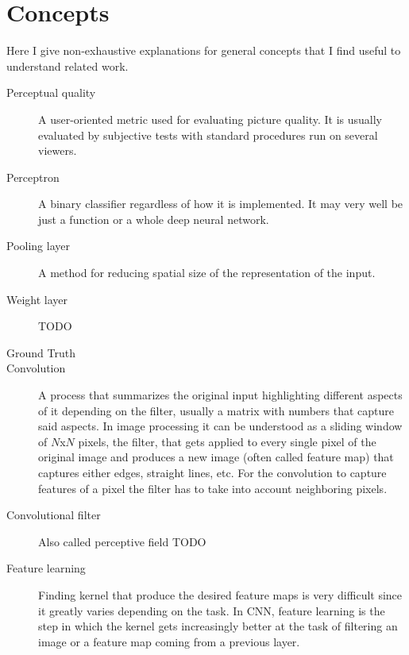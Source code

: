 
\chapter{Concepts}
\label{sec:concepts}


Here I give non-exhaustive explanations for general concepts that I find useful to understand related work.

\begin{description}

  \item[Perceptual quality]
  A user-oriented metric used for evaluating picture quality.
  It is usually evaluated by subjective tests with standard procedures run on several viewers. \cite{Lin2011}

  \item[Perceptron]
  A binary classifier regardless of how it is implemented. It may very well be just a function or a whole deep neural network.

  \item[Pooling layer]
  A method for reducing spatial size of the representation of the input.

  \item[Weight layer]
  TODO
  \todo[inline]{}

  \item[Ground Truth]

  \item[Convolution]
  A process that summarizes the original input highlighting different aspects of it depending on the filter, usually a matrix with numbers that capture said aspects.
  In image processing it can be understood as a sliding window of $N$x$N$ pixels, the filter, that gets applied to every single pixel of the original image and produces a new image (often called feature map) that captures either edges, straight lines, etc.
  For the convolution to capture features of a pixel the filter has to take into account neighboring pixels.

  \item[Convolutional filter]
  Also called perceptive field
  TODO
  \todo[inline]{}

  \item[Feature learning]
  Finding kernel that produce the desired feature maps is very difficult since it greatly varies depending on the task.
  In CNN, feature learning is the step in which the kernel gets increasingly better at the task of filtering an image or a feature map coming from a previous layer.


\end{description}
